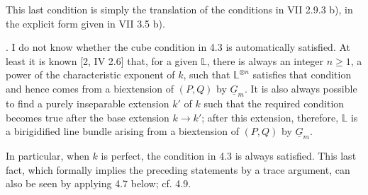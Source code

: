 This last condition is simply the translation of the conditions in
VII 2.9.3 b), in the explicit form given in VII 3.5 b).

\medskip
{}.  I do not know whether the cube condition in 4.3 is
automatically satisfied.  At least it is known [2, IV 2.6] that, for
a given $\mathbb L$, there is always an integer $n\geq1$, a power of
the characteristic exponent of $k$, such that
$\mathbb L^{\otimes n}$ satisfies that condition and hence comes from
a biextension of $(P,Q)$ by $\underline G_m$.  It is also always
possible to find a purely inseparable extension $k'$ of $k$ such that
the required condition becomes true after the base extension
$k\longrightarrow k'$; after this extension, therefore, $\mathbb L$
is a birigidified line bundle arising from a biextension of $(P,Q)$
by $\underline G_m$.

In particular, when $k$ is perfect, the condition in 4.3 is always
satisfied.  This last fact, which formally implies the preceding
statements by a trace argument, can also be seen by applying 4.7
below; cf. 4.9.

